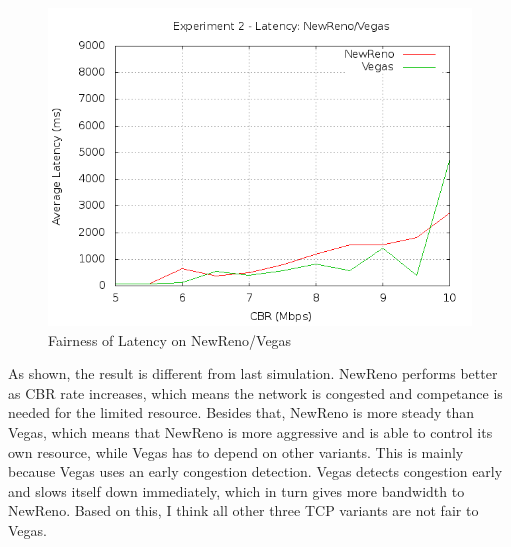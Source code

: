 \documentclass[10pt, conference]{lib/IEEEtran}
\begin{document}
\begin{figure}[H]
    \centering
    \includegraphics[width=1.0\linewidth]{plot/exp2-lt-NewReno-Vegas.png}
    \caption{Fairness of Latency on NewReno/Vegas}
    \label{fig:exp2_lt_nv}
\end{figure}
As shown, the result is different from last simulation. NewReno
 performs better as CBR rate increases, which means the network is 
 congested and competance is needed for the limited resource. Besides 
 that, NewReno is more steady than Vegas, which means that NewReno is 
 more aggressive and is able to control its own resource, while Vegas
 has to depend on other variants. This is mainly because Vegas uses an
 early congestion detection. Vegas detects congestion early and slows 
 itself down immediately, which in turn gives more bandwidth to NewReno.
 Based on this, I think all other three TCP variants are not fair to Vegas.
\end{document}

